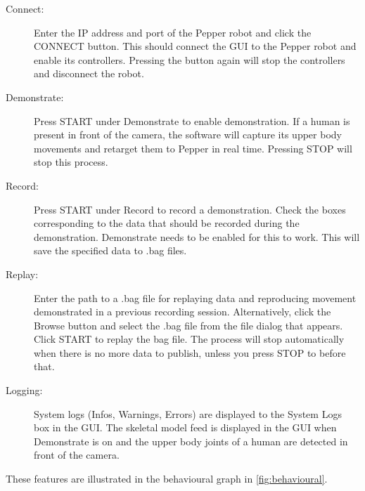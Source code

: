 \documentclass{CSSRforAfrica}
\begin{document}
\begin{description}
	\item[Connect: ] Enter the IP address and port of the Pepper robot and click the CONNECT button. This should connect the GUI to the Pepper robot and enable its controllers. Pressing the button again will stop the controllers and disconnect the robot.
    \item[Demonstrate: ] Press START under Demonstrate to enable demonstration. If a human is present in front of the camera, the software will capture its upper body movements and retarget them to Pepper in real time. Pressing STOP will stop this process.
	\item[Record: ] Press START under Record to record a demonstration. Check the boxes corresponding to the data that should be recorded during the demonstration. Demonstrate needs to be enabled for this to work. This will save the specified data to .bag files. 
	\item[Replay: ] Enter the path to a .bag file for replaying data and reproducing movement demonstrated in a previous recording session. Alternatively, click the Browse button and select the .bag file from the file dialog that appears. Click START to replay the bag file. The process will stop automatically when there is no more data to publish, unless you press STOP to before that. 
	\item[Logging: ] System logs (Infos, Warnings, Errors) are displayed to the System Logs box in the GUI. The skeletal model feed is displayed in the GUI when Demonstrate is on and the upper body joints of a human are detected in front of the camera. 
\end{description}

These features are illustrated in the behavioural graph in \cref{fig:behavioural}.
\end{document}
